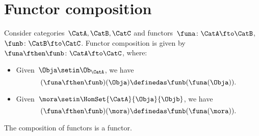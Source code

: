 
\section{Functor composition}
\begin{ctdefinition}
    \label{def:functor_composition}
    Consider categories~$\CatA,\CatB,\CatC$ and functors~$\funa\colon \CatA\fto \CatB$,~$\funb \colon \CatB\fto \CatC$.
    Functor composition is given by~$\funa\fthen \funb\colon \CatA \fto \CatC$, where:
    \begin{itemize}
        \item Given~$\Obja\setin \Ob_\CatA$, we have
              \begin{equation}
                  (\funa\fthen \funb)(\Obja)
                  \definedas\funb(\funa(\Obja)).
              \end{equation}
        \item Given~$\mora \setin \HomSet{\CatA}{\Obja}{\Objb}$, we have
              \begin{equation}
                  (\funa\fthen \funb)(\mora)
                  \definedas \funb(\funa(\mora)).
              \end{equation}
    \end{itemize}
\end{ctdefinition}

\begin{lemma}
    \label{lem:functors_compose}
    The composition of functors is a functor.
\end{lemma}

